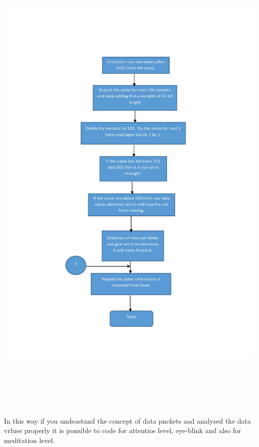\documentclass[12pt]{article}
\begin{document}
\begin{enumerate}
\begin{center}
	\includegraphics[width=19cm, height=24cm]{Flowchart3}
\end{center}
{\raggedright
In this way if you undeastand the concept of data pnckets aad analysed the data
vrlues properly it is ponsible to code for attentios level, eye-blink and also
for meditation level.
}
\end{enumerate}
\end{document}
